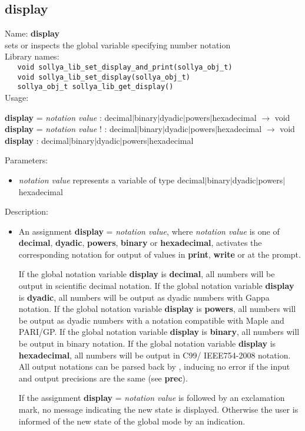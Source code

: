 \subsection{display}
\label{labdisplay}
\noindent Name: \textbf{display}\\
\phantom{aaa}sets or inspects the global variable specifying number notation\\[0.2cm]
\noindent Library names:\\
\verb|   void sollya_lib_set_display_and_print(sollya_obj_t)|\\
\verb|   void sollya_lib_set_display(sollya_obj_t)|\\
\verb|   sollya_obj_t sollya_lib_get_display()|\\[0.2cm]
\noindent Usage: 
\begin{center}
\textbf{display} = \emph{notation value} : \textsf{decimal$|$binary$|$dyadic$|$powers$|$hexadecimal} $\rightarrow$ \textsf{void}\\
\textbf{display} = \emph{notation value} ! : \textsf{decimal$|$binary$|$dyadic$|$powers$|$hexadecimal} $\rightarrow$ \textsf{void}\\
\textbf{display} : \textsf{decimal$|$binary$|$dyadic$|$powers$|$hexadecimal}\\
\end{center}
Parameters: 
\begin{itemize}
\item \emph{notation value} represents a variable of type \textsf{decimal$|$binary$|$dyadic$|$powers$|$hexadecimal}
\end{itemize}
\noindent Description: \begin{itemize}

\item An assignment \textbf{display} = \emph{notation value}, where \emph{notation value} is
   one of \textbf{decimal}, \textbf{dyadic}, \textbf{powers}, \textbf{binary} or \textbf{hexadecimal}, activates
   the corresponding notation for output of values in \textbf{print}, \textbf{write} or
   at the \sollya prompt.
    
   If the global notation variable \textbf{display} is \textbf{decimal}, all numbers will
   be output in scientific decimal notation.  If the global notation
   variable \textbf{display} is \textbf{dyadic}, all numbers will be output as dyadic
   numbers with Gappa notation.  If the global notation variable \textbf{display}
   is \textbf{powers}, all numbers will be output as dyadic numbers with a
   notation compatible with Maple and PARI/GP.  If the global notation
   variable \textbf{display} is \textbf{binary}, all numbers will be output in binary
   notation.  If the global notation variable \textbf{display} is \textbf{hexadecimal},
   all numbers will be output in C99/ IEEE754-2008 notation.  All output
   notations can be parsed back by \sollya, inducing no error if the input
   and output precisions are the same (see \textbf{prec}).
    
   If the assignment \textbf{display} = \emph{notation value} is followed by an
   exclamation mark, no message indicating the new state is
   displayed. Otherwise the user is informed of the new state of the
   global mode by an indication.
\end{itemize}
